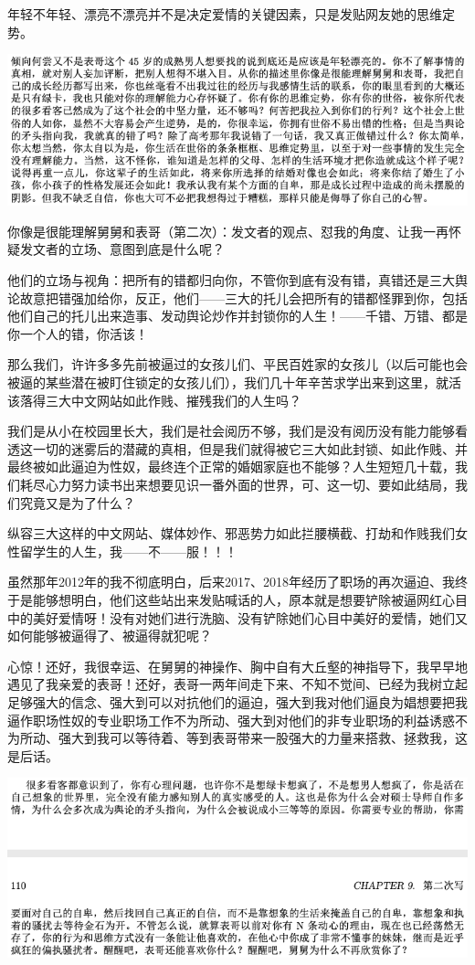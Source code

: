 \documentclass[9pt, b5paper]{article}
\begin{document}
年轻不年轻、漂亮不漂亮并不是决定爱情的关键因素，只是发贴网友她的思维定势。

\begin{center}
\includegraphics[width=.9\linewidth]{./pic/p1p114-5.png}
\end{center}

你像是很能理解舅舅和表哥（第二次）：发文者的观点、怼我的角度、让我一再怀疑发文者的立场、意图到底是什么呢？


他们的立场与视角：把所有的错都归向你，不管你到底有没有错，真错还是三大舆论故意把错强加给你，反正，他们——三大的托儿会把所有的错都怪罪到你，包括他们自己的托儿出来造事、发动舆论炒作并封锁你的人生！——千错、万错、都是你一个人的错，你活该！

那么我们，许许多多先前被逼过的女孩儿们、平民百姓家的女孩儿（以后可能也会被逼的某些潜在被盯住锁定的女孩儿们），我们几十年辛苦求学出来到这里，就活该落得三大中文网站如此作贱、摧残我们的人生吗？

我们是从小在校园里长大，我们是社会阅历不够，我们是没有阅历没有能力能够看透这一切的迷雾后的潜藏的真相，但是我们就得被它三大如此封锁、如此作贱、并最终被如此逼迫为性奴，最终连个正常的婚姻家庭也不能够？人生短短几十载，我们耗尽心力努力读书出来想要见识一番外面的世界，可、这一切、要如此结局，我们究竟又是为了什么？

纵容三大这样的中文网站、媒体妙作、邪恶势力如此拦腰横截、打劫和作贱我们女性留学生的人生，我——不——服！！！

虽然那年2012年的我不彻底明白，后来2017、2018年经历了职场的再次逼迫、我终于是能够想明白，他们这些站出来发贴喊话的人，原本就是想要铲除被逼网红心目中的美好爱情呀！没有对她们进行洗脑、没有铲除她们心目中美好的爱情，她们又如何能够被逼得了、被逼得就犯呢？

心惊！还好，我很幸运、在舅舅的神操作、胸中自有大丘壑的神指导下，我早早地遇见了我亲爱的表哥！还好，表哥一两年间走下来、不知不觉间、已经为我树立起足够强大的信念、强大到可以对抗他们的逼迫，强大到我对他们逼良为娼想要把我逼作职场性奴的专业职场工作不为所动、强大到对他们的非专业职场的利益诱惑不为所动、强大到我可以等待着、等到表哥带来一股强大的力量来搭救、拯救我，这是后话。 

\begin{center}
\includegraphics[width=.9\linewidth]{./pic/p1p109-6.png}
\end{center}
\end{document}
